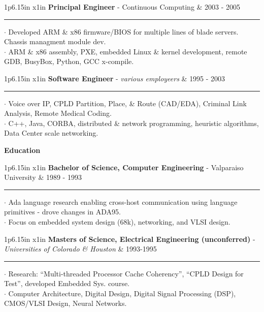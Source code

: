 \documentclass[10pt]{article}
\newcommand{\cvsection}[1]
{
	\begin{center}
		\large\textcolor{sectcol}{\textbf{#1}}
	\end{center}
}
\newcommand{\cveventone}[4]
{

\begin{tabular*}{1\textwidth}{p{6.15in}  x{1in}}
	\textbf{#2} - \textcolor{bgcol}{#3} &   \vspace{2.5pt}\textcolor{sectcol}{#1}
\end{tabular*}

\vspace{-8pt}
\textcolor{softcol}{\hrule}
\vspace{6pt}

  $\cdot$ #4\\[3pt]

}
\newcommand{\cveventtwo}[5]
{

\begin{tabular*}{1\textwidth}{p{6.15in}  x{1in}}
	\textbf{#2} - \textcolor{bgcol}{#3} &   \vspace{2.5pt}\textcolor{sectcol}{#1}
\end{tabular*}

\vspace{-8pt}
\textcolor{softcol}{\hrule}
\vspace{6pt}

  $\cdot$ #4\\[3pt]
  $\cdot$ #5\\[6pt]

}
\begin{document}
%
\cveventtwo{2003 - 2005}{Principal Engineer}{Continuous Computing}
{Developed ARM \& x86 firmware/BIOS for multiple lines of blade
  servers.  Chassis managment module dev.}
{ARM \& x86 assembly, PXE, embedded Linux \& kernel development,
  remote GDB, BusyBox, Python, GCC x-compile.}

\cveventtwo{1995 - 2003}{Software Engineer}{\it various employeers}
           {Voice over IP, CPLD Partition, Place, \& Route (CAD/EDA),
             Criminal Link Analysis, Remote Medical Coding.}
           {C++, Java, CORBA, distributed \& network programming,
             heuristic algorithms, Data Center scale networking.}

%
%
%
%
\cvsection{Education}

%
\cveventtwo{1989 - 1993}
           {Bachelor of Science, Computer Engineering}
           {Valparaiso University}
           {Ada language research enabling cross-host communication
             using language primitives - drove changes in ADA95.}
           {Focus on embedded system design (68k), networking, and
             VLSI design.}

\cveventtwo{1993-1995}
           {Masters of Science, Electrical Engineering {\normalfont (unconferred)} }
           {{\it Universities of Colorado \& Houston}}
           {Research:  ``Multi-threaded Processor Cache Coherency'',
             ``CPLD Design for Test'', developed Embedded Sys. course.}
           {Computer Architecture, Digital Design, Digital Signal
             Processing (DSP), CMOS/VLSI Design, Neural Networks.}

\end{document}
